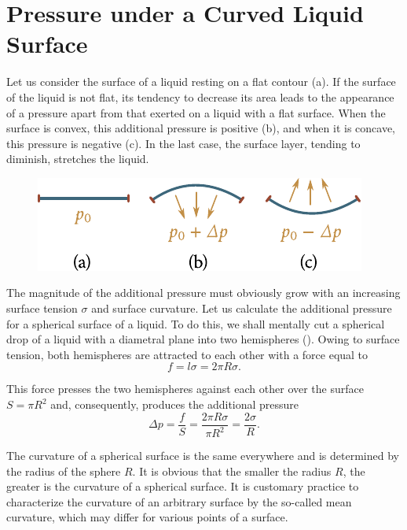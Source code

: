 \section{Pressure under a Curved Liquid Surface}\label{sec:14_3}

Let us consider the surface of a liquid resting on a flat contour (a). If the surface of the liquid is not flat, its tendency to decrease its area leads to the appearance of a pressure apart from that exerted on a liquid with a flat surface. When the surface is convex, this additional pressure is positive (b), and when it is concave, this pressure is negative (c). In the last case, the surface layer, tending to diminish, stretches the liquid.

\begin{figure}[t]
	\begin{center}
		\includegraphics[scale=1.1]{figures/ch_14/fig_14_3.pdf}
		\caption[]{}
		\label{fig:14_3}
	\end{center}
	\vspace{-0.8cm}
\end{figure}

The magnitude of the additional pressure must obviously grow with an increasing surface tension $\sigma$ and surface curvature. Let us calculate the additional pressure for a spherical surface of a liquid. To do this, we shall mentally cut a spherical drop of a liquid with a diametral plane into two hemispheres (). Owing to surface tension, both hemispheres are attracted to each other with a force equal to
\begin{equation*}
	f = l\sigma = 2\pi R\sigma.
\end{equation*}

\noindent
This force presses the two hemispheres against each other over the surface $S=\pi R^2$ and, consequently, produces the additional pressure
\begin{equation}\label{eq:14_1}
	\Delta p = \frac{f}{S} = \frac{2\pi R\sigma}{\pi R^2} = \frac{2\sigma}{R}.
\end{equation}

The curvature of a spherical surface is the same everywhere and is determined by the radius of the sphere $R$. It is obvious that the smaller the radius $R$, the greater is the curvature of a spherical surface. It is customary practice to characterize the curvature of an arbitrary surface by the so-called mean curvature, which may differ for various points of a surface.

